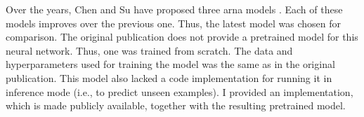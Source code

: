 
Over the years, Chen and Su have proposed three \gls{arna}
models \parencite{chen2018functional, chen2019harmony,
chen2021attend}. Each of these models improves over the
previous one. Thus, the latest model
\parencite{chen2021attend} was chosen for comparison. The
original publication does not provide a pretrained model for
this neural network. Thus, one was trained from scratch. The
data and hyperparameters used for training the model was the
same as in the original publication. This model also lacked
a code implementation for running it in inference mode
(i.e., to predict unseen examples). I provided an
implementation, which is made publicly available, together
with the resulting pretrained
model.
